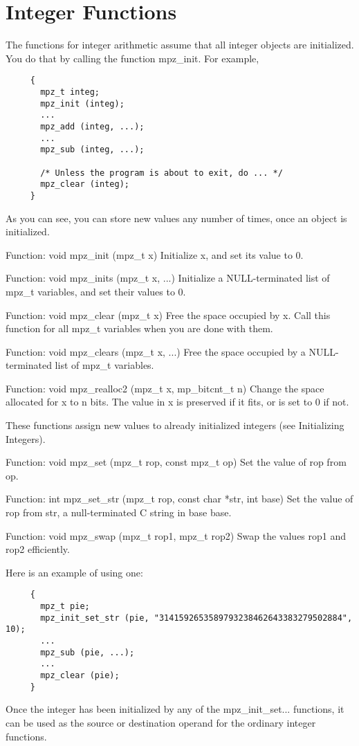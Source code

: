 \section{Integer Functions}
The functions for integer arithmetic assume that all integer objects are
initialized. You do that by calling the function mpz\_init. For example,
\begin{lstlisting}
     {
       mpz_t integ;
       mpz_init (integ);
       ...
       mpz_add (integ, ...);
       ...
       mpz_sub (integ, ...);
     
       /* Unless the program is about to exit, do ... */
       mpz_clear (integ);
     }
\end{lstlisting}     
As you can see, you can store new values any number of times, once an object is
initialized.

 Function: void mpz\_init (mpz\_t x)
Initialize x, and set its value to 0.

 Function: void mpz\_inits (mpz\_t x, ...)
Initialize a NULL-terminated list of mpz\_t variables, and set their values to
0.

 Function: void mpz\_clear (mpz\_t x)
Free the space occupied by x. Call this function for all mpz\_t variables when
you are done with them.

 Function: void mpz\_clears (mpz\_t x, ...)
Free the space occupied by a NULL-terminated list of mpz\_t variables.

 Function: void mpz\_realloc2 (mpz\_t x, mp\_bitcnt\_t n)
Change the space allocated for x to n bits. The value in x is preserved if it
fits, or is set to 0 if not.

These functions assign new values to already initialized integers (see
Initializing Integers).

 Function: void mpz\_set (mpz\_t rop, const mpz\_t op)
Set the value of rop from op.

 Function: int mpz\_set\_str (mpz\_t rop, const char *str, int base)
Set the value of rop from str, a null-terminated C string in base base.

 Function: void mpz\_swap (mpz\_t rop1, mpz\_t rop2)
Swap the values rop1 and rop2 efficiently.

Here is an example of using one:
\begin{lstlisting}
     {
       mpz_t pie;
       mpz_init_set_str (pie, "3141592653589793238462643383279502884", 10);
       ...
       mpz_sub (pie, ...);
       ...
       mpz_clear (pie);
     }
\end{lstlisting}
Once the integer has been initialized by any of the mpz\_init\_set... functions,
it can be used as the source or destination operand for the ordinary integer
functions.

